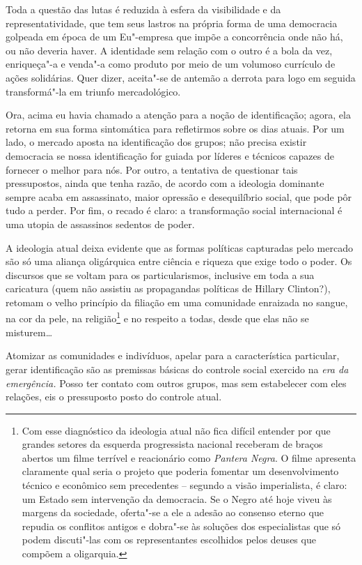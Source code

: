 Toda a questão das lutas é reduzida à esfera da visibilidade e da
representatividade, que tem seus lastros na própria forma de uma
democracia golpeada em época de um Eu"-empresa que impõe a concorrência
onde não há, ou não deveria haver. A identidade sem relação com o outro
é a bola da vez, enriqueça"-a e venda"-a como produto por meio de um
volumoso currículo de ações solidárias. Quer dizer, aceita"-se de antemão
a derrota para logo em seguida transformá"-la em triunfo mercadológico.

Ora, acima eu havia chamado a atenção para a noção de identificação;
agora, ela retorna em sua forma sintomática para refletirmos sobre os
dias atuais. Por um lado, o mercado aposta na identificação dos grupos;
não precisa existir democracia se nossa identificação for guiada por
líderes e técnicos capazes de fornecer o melhor para nós. Por outro, a
tentativa de questionar tais pressupostos, ainda que tenha razão, de
acordo com a ideologia dominante sempre acaba em assassinato, maior
opressão e desequilíbrio social, que pode pôr tudo a perder. Por fim, o
recado é claro: a transformação social internacional é uma utopia de
assassinos sedentos de poder.

A ideologia atual deixa evidente que as formas políticas capturadas pelo
mercado são só uma aliança oligárquica entre ciência e riqueza que exige
todo o poder. Os discursos que se voltam para os particularismos,
inclusive em toda a sua caricatura (quem não assistiu as propagandas
políticas de Hillary Clinton?), retomam o velho princípio da filiação em
uma comunidade enraizada no sangue, na cor da pele, na
religião\footnote{Com esse diagnóstico da ideologia atual não fica
  difícil entender por que grandes setores da esquerda progressista
  nacional receberam de braços abertos um filme terrível e reacionário
  como \emph{Pantera Negra}. O filme apresenta claramente qual seria o
  projeto que poderia fomentar um desenvolvimento técnico e econômico
  sem precedentes -- segundo a visão imperialista, é claro: um Estado
  sem intervenção da democracia. Se o Negro até hoje viveu às margens da
  sociedade, oferta"-se a ele a adesão ao consenso eterno que repudia os
  conflitos antigos e dobra"-se às soluções dos especialistas que só
  podem discuti"-las com os representantes escolhidos pelos deuses que
  compõem a oligarquia.} e no respeito a todas, desde que elas não se
misturem\ldots{}

Atomizar as comunidades e indivíduos, apelar para a característica
particular, gerar identificação são as premissas básicas do controle
social exercido na \emph{era da emergência.} Posso ter contato com
outros grupos, mas sem estabelecer com eles relações, eis o pressuposto
posto do controle atual.

